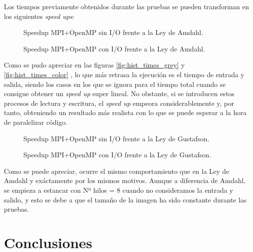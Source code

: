 \documentclass[12pt]{report} %
\begin{document}
Los tiempos previamente obtenidos durante las pruebas se pueden transforman en los siguientes \textit{speed ups}:

\begin{figure}[H]
	\makebox[\textwidth][c]{
        
    }
	\caption{Speedup MPI+OpenMP sin I/O frente a la Ley de Amdahl.}
    \label{fig:comparacion_speedup}
\end{figure}
\begin{figure}[H]
	\makebox[\textwidth][c]{
        
    }
	\caption{Speedup MPI+OpenMP con I/O frente a la Ley de Amdahl.}
    \label{fig:comparacion_speedup}
\end{figure}

Como se pudo apreciar en las figuras \ref{fig:hist_times_grey}  y
\ref{fig:hist_times_color} , lo que más retrasa la
ejecución es el tiempo de entrada y salida, siendo los casos en los que se ignora para el tiempo total
cuando se consigue obtener un \textit{speed up} super lineal. No obstante,
si se introducen estos procesos de lectura y escritura, el \textit{speed up} empeora considerablemente y, por
tanto, obteniendo un resultado más realista con lo que se puede esperar a la hora de paralelizar código.

\begin{figure}[H]
	\makebox[\textwidth][c]{
        
    }
	\caption{Speedup MPI+OpenMP sin I/O frente a la Ley de Gustafson.}
    \label{fig:comparacion_speedup}
\end{figure}
\begin{figure}[H]
	\makebox[\textwidth][c]{
        
    }
	\caption{Speedup MPI+OpenMP con I/O frente a la Ley de Gustafson.}
    \label{fig:comparacion_speedup}
\end{figure}

Como se puede apreciar, ocurre el mismo comportamiento que en la Ley de Amdahl y exáctamente por
los mismos motivos. Aunque a diferencia de Amdahl, se empieza a estancar con Nº hilos = 8 cuando no consideramos
la entrada y salido, y esto se debe a que el tamaño de la imagen ha sido constante durante las pruebas.

\chapter{Conclusiones}
\end{document}
